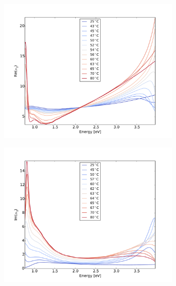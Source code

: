 %
%
\begin{figure}
    \centering
    \begin{subfigure}[b]{0.49\textwidth}
        \centering
        \includegraphics[width=\textwidth]{Results/Sim2/re_alpha_parallel.pdf}
        \caption{}
        \label{fig:2}
    \end{subfigure}
    \begin{subfigure}[b]{0.49\textwidth}
        \centering
        \includegraphics[width=\textwidth]{Results/Sim2/im_alpha_parallel.pdf}
        \caption{}
        \label{fig:2}
    \end{subfigure}

\end{figure}
